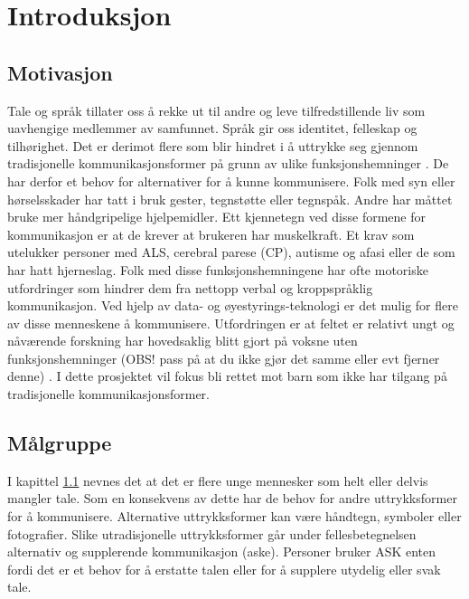 \documentclass[phd,tocprelim]{cornell}
\begin{document}
\printglossaries
\contentspage
\figurelistpage
\listoftodos

\normalspacing \setcounter{page}{1} 
\pagestyle{cornell} \addtolength{\parskip}{0.5\baselineskip}



\chapter{Introduksjon}




\section{Motivasjon}
\label{sec:motivasjon}

Tale og språk tillater oss å rekke ut til andre og leve tilfredstillende liv som uavhengige medlemmer av samfunnet. Språk gir oss identitet, felleskap  og tilhørighet. Det er derimot flere som blir hindret i å uttrykke seg gjennom tradisjonelle kommunikasjonsformer på grunn av ulike funksjonshemninger  \cite{tobii}. De har derfor et behov for alternativer for å kunne kommunisere. Folk med syn eller hørselsskader har tatt i bruk gester, tegnstøtte eller tegnspåk. Andre har måttet bruke mer håndgripelige hjelpemidler. Ett kjennetegn ved disse formene for kommunikasjon er at de krever at brukeren har muskelkraft. Et krav som utelukker  personer med ALS, cerebral parese (CP), autisme og afasi eller de som har hatt hjerneslag. Folk med disse funksjonshemningene har ofte motoriske utfordringer som hindrer dem fra nettopp verbal og kroppspråklig kommunikasjon. Ved hjelp av data- og øyestyrings-teknologi er det mulig for flere av disse menneskene å kommunisere. Utfordringen er at feltet er relativt ungt og nåværende forskning har hovedsaklig blitt gjort på voksne uten funksjonshemninger (OBS! pass på at du ikke gjør det samme eller evt fjerner denne) \cite{aac}. I dette prosjektet vil fokus bli rettet mot barn som ikke har tilgang på tradisjonelle kommunikasjonsformer.




\section{Målgruppe}

I kapittel \ref{sec:motivasjon} nevnes det at det er flere unge mennesker som helt eller delvis mangler tale. Som en konsekvens av dette har de behov for andre uttrykksformer for å kommunisere. Alternative uttrykksformer kan være håndtegn, symboler eller fotografier. Slike utradisjonelle uttrykksformer går under fellesbetegnelsen alternativ og supplerende kommunikasjon (\gls{aske}).
Personer bruker ASK enten fordi det er et behov for å erstatte talen eller for å supplere utydelig eller svak tale.
\end{document}
